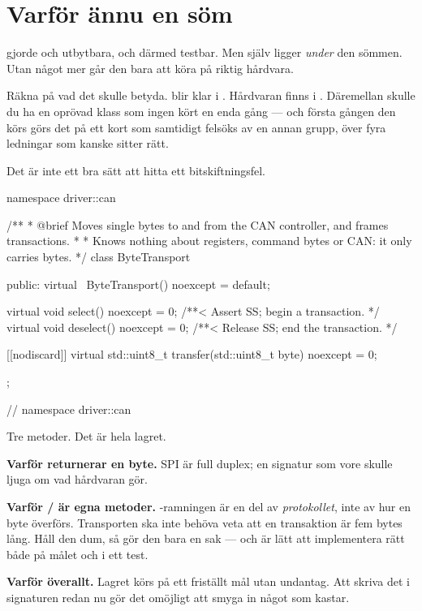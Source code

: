 \section{Varför ännu en söm}
\label{sec:whyseam}

 gjorde  och  utbytbara, och därmed  testbar.
Men  själv ligger \emph{under} den sömmen. Utan något mer går den bara att köra på riktig
hårdvara.

Räkna på vad det skulle betyda.  blir klar i . Hårdvaran finns i
. Däremellan skulle du ha en oprövad klass som ingen kört en enda gång --- och
första gången den körs görs det på ett kort som samtidigt felsöks av en annan grupp, över fyra
ledningar som kanske sitter rätt.

Det är inte ett bra sätt att hitta ett bitskiftningsfel.

\begin{cppcode}
namespace driver::can
{
/**
 * @brief Moves single bytes to and from the CAN controller, and frames transactions.
 *
 *        Knows nothing about registers, command bytes or CAN: it only carries bytes.
 */
class ByteTransport
{
public:
    virtual ~ByteTransport() noexcept = default;

    virtual void select() noexcept   = 0;   /**< Assert SS; begin a transaction. */
    virtual void deselect() noexcept = 0;   /**< Release SS; end the transaction. */

    [[nodiscard]] virtual std::uint8_t transfer(std::uint8_t byte) noexcept = 0;
};
} // namespace driver::can
\end{cppcode}

Tre metoder. Det är hela lagret.

\textbf{Varför  returnerar en byte.} SPI är full duplex; en signatur som vore
 skulle ljuga om vad hårdvaran gör.

\textbf{Varför / är egna metoder.} -ramningen är en del av
\emph{protokollet}, inte av hur en byte överförs. Transporten ska inte behöva veta att en
transaktion är fem bytes lång. Håll den dum, så gör den bara en sak --- och är lätt att
implementera rätt både på målet och i ett test.

\textbf{Varför  överallt.} Lagret körs på ett friställt mål utan undantag. Att
skriva det i signaturen redan nu gör det omöjligt att smyga in något som kastar.

